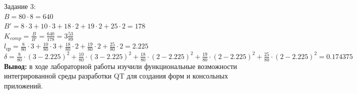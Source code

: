 \documentclass[a4paper,14pt]{extarticle}
\begin{document}
Задание 3:\\
$B = 80 \cdot 8 = 640$\\
$B' = 8 \cdot 3 + 10 \cdot 3 + 18 \cdot 2 + 19 \cdot 2 + 25 \cdot 2 = 178$\\
$K_{comp} = \frac{B}{B'} = \frac{640}{178} = 3\frac{53}{89}$\\
$l_{ср} = \frac{8}{80} \cdot 3 + \frac{10}{80} \cdot 3 + \frac{18}{80} \cdot 2 + \frac{19}{80} \cdot 2 + \frac{25}{80} \cdot 2 = 2.225$\\
$\delta = \frac{8}{80} \cdot (3 - 2.225)^2 + \frac{10}{80} \cdot (3 - 2.225)^2 + \frac{18}{80} \cdot (2 - 2.225)^2 + \frac{19}{80} \cdot (2 - 2.225)^2 + \frac{25}{80} \cdot (2 - 2.225)^2 = 0.174375$\\ 

\textbf{Вывод: } в ходе лабораторной работы изучили функциональные возможности интегрированной
среды разработки QT для создания форм и консольных приложений.
\end{document}
